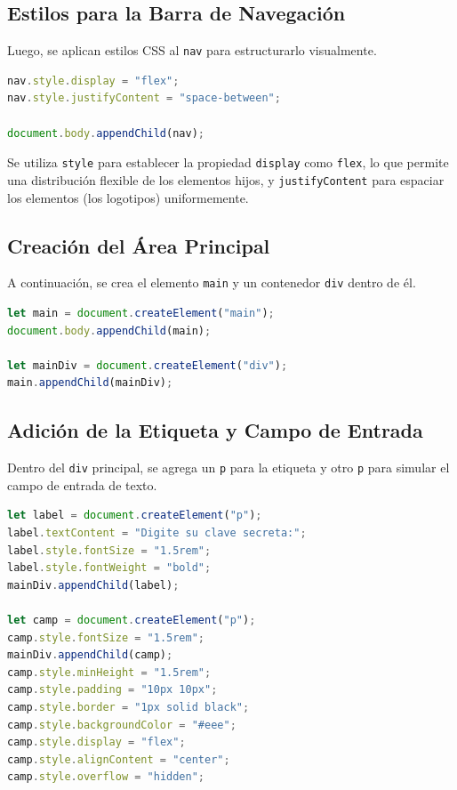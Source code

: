 \subsection*{Estilos para la Barra de Navegación}

Luego, se aplican estilos CSS al \texttt{nav} para estructurarlo visualmente.

\begin{lstlisting}[language=JavaScript]
nav.style.display = "flex";
nav.style.justifyContent = "space-between";

document.body.appendChild(nav);
\end{lstlisting}

Se utiliza \texttt{style} para establecer la propiedad \texttt{display} como \texttt{flex}, lo que permite una distribución flexible de los elementos hijos, y \texttt{justifyContent} para espaciar los elementos (los logotipos) uniformemente.

\subsection*{Creación del Área Principal}

A continuación, se crea el elemento \texttt{main} y un contenedor \texttt{div} dentro de él.

\begin{lstlisting}[language=JavaScript]
let main = document.createElement("main");
document.body.appendChild(main);

let mainDiv = document.createElement("div");
main.appendChild(mainDiv);
\end{lstlisting}

\subsection*{Adición de la Etiqueta y Campo de Entrada}

Dentro del \texttt{div} principal, se agrega un \texttt{p} para la etiqueta y otro \texttt{p} para simular el campo de entrada de texto.

\begin{lstlisting}[language=JavaScript]
let label = document.createElement("p");
label.textContent = "Digite su clave secreta:";
label.style.fontSize = "1.5rem";
label.style.fontWeight = "bold";
mainDiv.appendChild(label);

let camp = document.createElement("p");
camp.style.fontSize = "1.5rem";
mainDiv.appendChild(camp);
camp.style.minHeight = "1.5rem";
camp.style.padding = "10px 10px";
camp.style.border = "1px solid black";
camp.style.backgroundColor = "#eee";
camp.style.display = "flex";
camp.style.alignContent = "center";
camp.style.overflow = "hidden";
\end{lstlisting}

